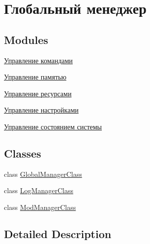 \hypertarget{group___global_manager}{}\section{Глобальный менеджер}
\label{group___global_manager}
\subsection*{Modules}
\begin{DoxyCompactItemize}
\item 
\hyperlink{group___command_managment}{Управление командами}
\item 
\hyperlink{group___memory_managment}{Управление памятью}
\item 
\hyperlink{group___resource_managment}{Управление ресурсами}
\item 
\hyperlink{group___settings}{Управление настройками}
\item 
\hyperlink{group___system_state_managment}{Управление состоянием системы}
\end{DoxyCompactItemize}
\subsection*{Classes}
\begin{DoxyCompactItemize}
\item 
class \hyperlink{class_global_manager_class}{Global\+Manager\+Class}
\item 
class \hyperlink{class_log_manager_class}{Log\+Manager\+Class}
\item 
class \hyperlink{class_mod_manager_class}{Mod\+Manager\+Class}
\end{DoxyCompactItemize}


\subsection{Detailed Description}
